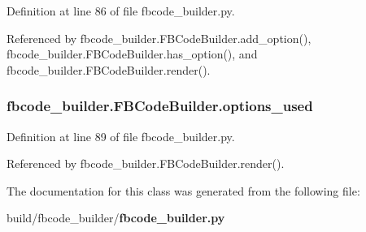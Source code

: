 Definition at line 86 of file fbcode\+\_\+builder.\+py.



Referenced by fbcode\+\_\+builder.\+F\+B\+Code\+Builder.\+add\+\_\+option(), fbcode\+\_\+builder.\+F\+B\+Code\+Builder.\+has\+\_\+option(), and fbcode\+\_\+builder.\+F\+B\+Code\+Builder.\+render().

\subsubsection[{options\+\_\+used}]{\setlength{\rightskip}{0pt plus 5cm}fbcode\+\_\+builder.\+F\+B\+Code\+Builder.\+options\+\_\+used}\label{classfbcode__builder_1_1FBCodeBuilder_ab5e799fd429347a660bad6c143cd109d}


Definition at line 89 of file fbcode\+\_\+builder.\+py.



Referenced by fbcode\+\_\+builder.\+F\+B\+Code\+Builder.\+render().



The documentation for this class was generated from the following file\+:\begin{DoxyCompactItemize}
\item 
build/fbcode\+\_\+builder/{\bf fbcode\+\_\+builder.\+py}\end{DoxyCompactItemize}
